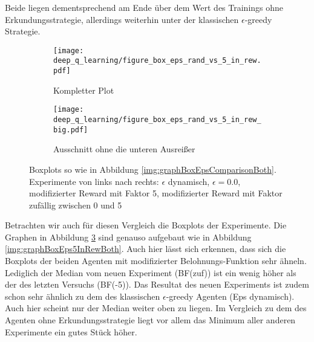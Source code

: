 Beide liegen dementsprechend am Ende über dem Wert des Trainings ohne Erkundungsstrategie, allerdings weiterhin unter der klassischen $ \epsilon $-greedy Strategie.
\begin{figure}[h]
    \centering
    \begin{subfigure}[b]{0.7\textwidth}
        \texttt{[image: deep\_q\_learning/figure\_box\_eps\_rand\_vs\_5\_in\_rew.pdf]}
        \caption{Kompletter Plot}
        \label{img:graphBoxEpsRandVs5InRew}
    \end{subfigure}
    \begin{subfigure}[b]{0.7\textwidth}
        \texttt{[image: deep\_q\_learning/figure\_box\_eps\_rand\_vs\_5\_in\_rew\_big.pdf]}
        \caption{Ausschnitt ohne die unteren Ausreißer}
        \label{img:graphBoxEpsRandVs5InRewBig}
    \end{subfigure}
    \caption{Boxplots so wie in Abbildung \ref{img:graphBoxEpsComparisonBoth}. Experimente von links nach rechts: $ \epsilon $ dynamisch, $ \epsilon = 0.0 $, modifizierter Reward mit Faktor 5, modifizierter Reward mit Faktor zufällig zwischen 0 und 5}
    \label{img:graphBoxEpsRandVs5InRewBoth}
\end{figure}

Betrachten wir auch für diesen Vergleich die Boxplots der Experimente. Die Graphen in Abbildung \ref{img:graphBoxEpsRandVs5InRewBoth} sind genauso aufgebaut wie in Abbildung \ref{img:graphBoxEps5InRewBoth}. Auch hier lässt sich erkennen, dass sich die Boxplots der beiden Agenten mit modifizierter Belohnungs-Funktion sehr ähneln. Lediglich der Median vom neuen Experiment (BF(zuf)) ist ein wenig höher als der des letzten Versuchs (BF(-5)). Das Resultat des neuen Experiments ist zudem schon sehr ähnlich zu dem des klassischen $ \epsilon $-greedy Agenten (Eps dynamisch). Auch hier scheint nur der Median weiter oben zu liegen. Im Vergleich zu dem des Agenten ohne Erkundungsstrategie liegt vor allem das Minimum aller anderen Experimente ein gutes Stück höher.

